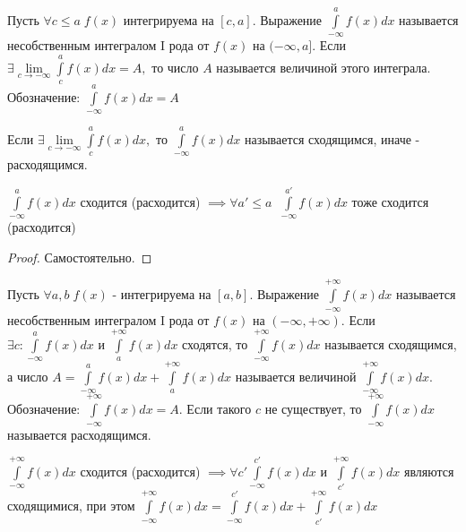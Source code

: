 \documentclass[../main.tex]{subfiles}
\begin{document}
\begin{definition}
    Пусть $\forall c\leqslant a\; f(x)$ интегрируема на $[c,a]$. Выражение $\int\limits_{-\infty  }^{a} f(x)dx$ называется несобственным интегралом I рода от $f(x)$ на $(-\infty,a]$. Если $\exists \lim\limits_{c\to -\infty}\int\limits_{c}^{a}f(x)dx=A,$ то число $A$ называется величиной этого интеграла. Обозначение: $\int\limits_{-\infty}^{a}f(x)dx=A$
\end{definition}
\begin{definition}
    Если $\exists \lim\limits_{c\to -\infty}\int\limits_{c}^{a}f(x)dx,$ то $\int\limits_{-\infty}^{a}f(x)dx$ называется сходящимся, иначе - расходящимся.
\end{definition}
\begin{theorem}
    $\int\limits_{-\infty   }^{a}f(x)dx  $ сходится (расходится) $\implies \forall a'\leqslant a \;\; \int\limits_{-\infty}^{a'} f(x)dx  $ тоже сходится (расходится)
\end{theorem}
\begin{proof}
    Самостоятельно. 
\end{proof}

\begin{definition}
        Пусть $ \forall a,b\; f(x)$ - интегрируема на $[a,b]$. Выражение $\int\limits_{-\infty}^{+\infty}f(x)dx $ называется несобственным интегралом I рода от $f(x)$ на $(-\infty,+\infty)$. Если $\exists c: \int\limits_{-\infty   }^{a}f(x)dx $ и $\int\limits_{a    }^{+\infty}f(x)dx $ сходятся, то $\int\limits_{-\infty}^{+\infty}f(x)dx $ называется сходящимся, а число $A=\int\limits_{-\infty}^{a}f(x)dx + \int\limits_{a }^{+\infty}f(x)dx $ называется величиной $\int\limits_{-\infty}^{+\infty}f(x)dx.$ Обозначение: $\int\limits_{-\infty }^{+\infty  } f(x)dx = A$. Если такого $c$ не существует, то $\int\limits_{-\infty}^{+\infty}f(x)dx  $ называется расходящимся.
\end{definition}
\begin{theorem}
    $\int\limits_{-\infty}^{+\infty}f(x)dx $ сходится (расходится) $\implies \forall c' \int\limits_{-\infty}^{c'}f(x)dx $ и $\int\limits_{c'}^{+\infty}f(x)dx $ являются сходящимися, при этом $\int\limits_{-\infty    }^{+\infty  } f(x)dx=\int\limits_{-\infty   }^{c'}  f(x)dx+\int\limits_{c'}^{+\infty}f(x)dx $
\end{theorem}
\end{document}
